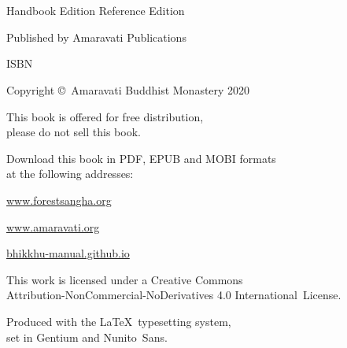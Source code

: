 \cleartoverso
\thispagestyle{empty}

\vspace*{-\baselineskip}

{%

\ifhandbookedition
\fontsize{9}{10}\selectfont
\else
\fontsize{9}{11}\selectfont
\fi
\centering
\setlength{\parindent}{0pt}%
\setlength{\parskip}{0.8\baselineskip}%

\thetitle\\
\thesubtitle\\
\ifhandbookedition
Handbook Edition
\else
Reference Edition
\fi

Published by Amaravati Publications

ISBN \theISBN

Copyright \copyright\ Amaravati Buddhist Monastery 2020

This book is offered for free distribution,\\
please do not sell this book.

Download this book in PDF, EPUB and MOBI formats\\
at the following addresses:

\href{https://forestsangha.org/}{www.forestsangha.org}

\href{https://www.amaravati.org/}{www.amaravati.org}

\href{https://bhikkhu-manual.github.io/}{bhikkhu-manual.github.io}

\vfill

This work is licensed under a Creative Commons\\
Attribution-NonCommercial-NoDerivatives 4.0 International~License.

Produced with the \LaTeX\ typesetting system,\\
set in Gentium and Nunito~Sans.

\theEditionInfo

}
